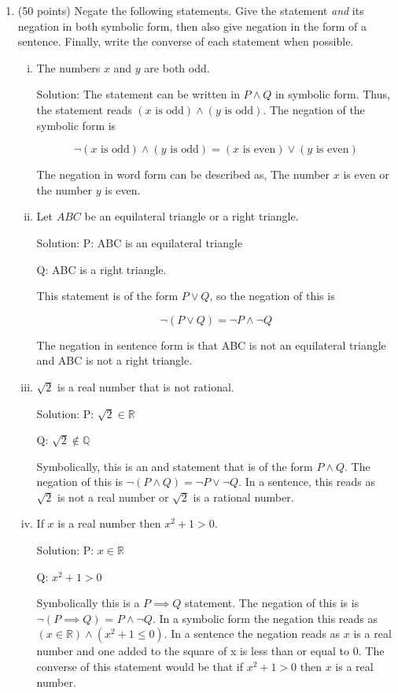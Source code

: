 \documentclass[11pt]{amsart}
\newcommand{\R}{\mathbb{R}}
\newcommand{\Q}{\mathbb{Q}}
\begin{document}
\begin{enumerate}
\item (50 points) Negate the following statements. Give the statement \emph{and} its negation in both symbolic form, then also give negation in the form of a sentence. Finally, write the converse of each statement when possible.

\begin{enumerate}[(i)]
\item The numbers $x$ and $y$ are both odd.

Solution: The statement can be written in $P \wedge Q$ in symbolic form. Thus, the statement reads $(x\text{ is odd}) \wedge (y\text{ is odd})$. The negation of the symbolic form is

\[
\neg(x\text{ is odd}) \wedge (y\text{ is odd}) = (x\text{ is even}) \vee (y\text{ is even})
\]

The negation in word form can be described as, The number $x$ is even or the number $y$ is even.


\item Let $ABC$ be an equilateral triangle or a right triangle.

Solution: P: ABC is an equilateral triangle

Q: ABC is a right triangle.

This statement is of the form $P \vee Q$, so the negation of this is

\[
    \neg(P \vee Q) = \neg P \wedge \neg Q
\]

The negation in sentence form is that ABC is not an equilateral triangle and ABC is not a right triangle.


\item $\sqrt{2}$ is a real number that is not rational.

Solution: P: $\sqrt{2} \in \R$

Q: $\sqrt{2} \notin \Q$

Symbolically, this is an and statement that is of the form $P \wedge Q$. The negation of this is $\neg( P \wedge Q) = \neg P \vee \neg Q$. In a sentence, this reads as $\sqrt{2}$ is not a real number or $\sqrt{2}$ is a rational number.


\item If $x$ is a real number then $x^2+1>0.$ 

Solution: P: $x \in \R$

Q: $x^2 + 1 > 0$

Symbolically this is a $P \implies Q$ statement. The negation of this is is $\neg(P \implies Q)$ = $P \wedge \neg Q$. In a symbolic form the negation this reads as $(x \in \R) \wedge (x^2 +1 \leq 0) $. In a sentence the negation reads as $x$ is a real number and one added to the square of x is less than or equal to 0. The converse of this statement would be that if $x^2+1 > 0$ then $x$ is a real number.


\end{enumerate}
\end{enumerate}
\end{document}
